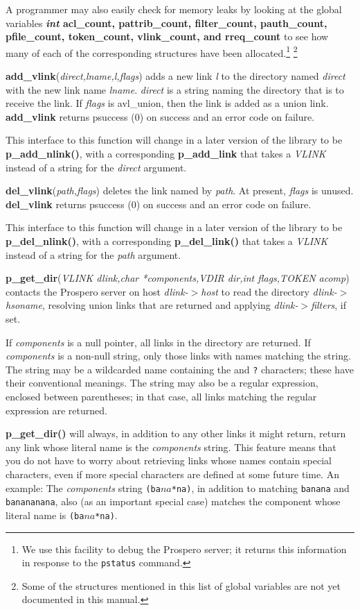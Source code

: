 A programmer may also easily check for memory leaks by looking at the
global variables {\bf {\it int\/} acl\_count, pattrib\_count,
filter\_count, pauth\_count, pfile\_count, token\_count, vlink\_count,
and rreq\_count} to see how many of each of the  corresponding
structures have been allocated.\footnote{
	We use this facility to debug the Prospero server; it returns
this information in response to the {\tt pstatus} command.}%
	\footnote{
Some of the structures mentioned in this list of global variables
are not yet documented in this manual.}

{\bf add\_vlink}({\it direct,lname,l,flags}) adds a new link {\it l}
to the directory named {\it direct} with the new link name {\it
lname}.  {\it direct} is a string naming the directory that is to
receive the link.  If {\it flags} is {\sc avl\_union}, then the link
is added as a union link. {\bf add\_vlink} returns {\sc psuccess} (0)
on success and an error code on failure. 

This interface to this function will change in a later version of the
library to be {\bf p\_add\_nlink()}, with a corresponding {\bf p\_add\_link}
that takes a {\it VLINK} instead of a string for the {\it direct} argument.

{\bf del\_vlink}({\it path,flags}) deletes the link named by {\it
path}.  At present, {\it flags} is unused.  {\bf del\_vlink} returns
{\sc psuccess} (0) on success and an error code on failure.

This interface to this function will change in a later version of the
library to be {\bf p\_del\_nlink()}, with a corresponding {\bf p\_del\_link()}
that takes a {\it VLINK} instead of a string for the {\it path} argument.

{\bf p\_get\_dir}({\it VLINK dlink,char *components,VDIR dir,int
flags,TOKEN acomp})
contacts the Prospero server on host {\it dlink-$>$host} to read the directory
{\it dlink-$>$hsoname}, resolving union links that are returned and applying
{\it dlink-$>$filters}, if set.

If {\it components} is a null pointer, all links in the directory are
returned.  If {\it components} is a non-null string, only those
links with names matching the string.  The string may be a wildcarded name
containing the {\tt *} and {\tt ?} characters; these have their
conventional meanings.  The string may also be a regular expression,
enclosed between parentheses; in that case, all links matching the
regular expression are returned.

{\bf p\_get\_dir()} will always, in addition to any other links it might
return, return any link whose literal name is the {\it components}
string.  This feature means that you do not have to worry about
retrieving links whose names contain special characters, even if more
special characters are defined at some future time.  An example: The
{\it components} string {\tt (ba\(na\)*na)}, in addition to matching
{\tt banana} and {\tt banananana}, also (as an important special case)
matches the component whose literal name is {\tt (ba\(na\)*na)}.

